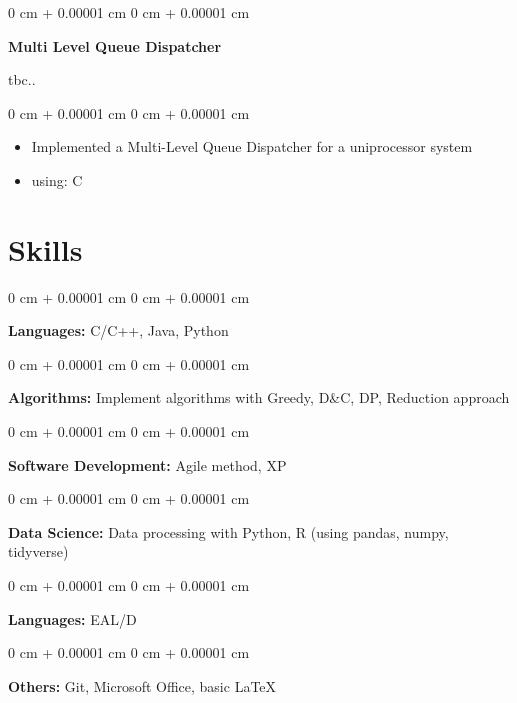 \documentclass[10pt, letterpaper]{article}
\newenvironment{highlights}{
    \begin{itemize}[
        topsep=0.10 cm,
        parsep=0.10 cm,
        partopsep=0pt,
        itemsep=0pt,
        leftmargin=0 cm + 10pt
    ]
}{
    \end{itemize}
} %
\newenvironment{onecolentry}{
    \begin{adjustwidth}{
        0 cm + 0.00001 cm
    }{
        0 cm + 0.00001 cm
    }
}{
    \end{adjustwidth}
} %
\newenvironment{twocolentry}[2][]{
    \onecolentry
    \def\secondColumn{#2}
    \setcolumnwidth{\fill, 4.5 cm}
    \begin{paracol}{2}
}{
    \switchcolumn \raggedleft \secondColumn
    \end{paracol}
    \endonecolentry
} %
\begin{document}
        \begin{twocolentry}{tbc..}
            \textbf{Multi Level Queue Dispatcher}
        \end{twocolentry}
        \vspace{0.10 cm}
        \begin{onecolentry}
            \begin{highlights}
                \item Implemented a Multi-Level Queue Dispatcher for a uniprocessor system 
                \item using: C
            \end{highlights}
        \end{onecolentry} 
        \vspace{0.2 cm}



    \section{Skills}
        \begin{onecolentry}
            \textbf{Languages:} C/C++, Java, Python
        \end{onecolentry}

        \vspace{0.2 cm}

        \begin{onecolentry}
            \textbf{Algorithms:} Implement algorithms with Greedy, D\&C, DP, Reduction approach
        \end{onecolentry}
        \vspace{0.2 cm}

        \begin{onecolentry}
            \textbf{Software Development:} Agile method, XP
        \end{onecolentry}
        \vspace{0.2 cm}

        \begin{onecolentry}
            \textbf{Data Science:} Data processing with Python, R (using pandas, numpy, tidyverse) 
        \end{onecolentry}
        \vspace{0.2 cm}

        \begin{onecolentry}
            \textbf{Languages:} EAL/D
        \end{onecolentry}
        \vspace{0.2 cm}

        \begin{onecolentry}
            \textbf{Others:} Git, Microsoft Office, basic LaTeX
        \end{onecolentry}
\end{document}
